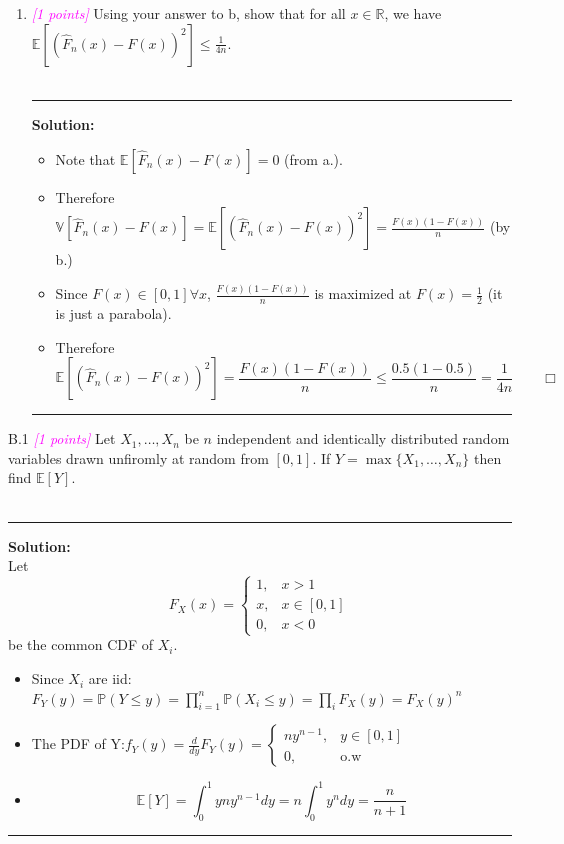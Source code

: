 \documentclass{article}
\newcommand{\field}[1]{\mathbb{#1}}
\newcommand{\1}{\mathbf{1}}
\newcommand{\E}{\mathbb{E}}
\newcommand{\V}{\mathbb{V}}
\renewcommand{\P}{\mathbb{P}}
\newcommand{\R}{\field{R}} %
\newcommand{\points}[1]{\small\textcolor{magenta}{\emph{[#1 points]}} \normalsize}
\begin{document}
\begin{enumerate}
    
    \noindent\rule{\textwidth}{1pt}
  \item \points{1} Using your answer to b, show that
    for all $x\in \R$, we have  $\displaystyle \E[ ( \widehat{F}_n(x) - F(x) )^2 ] \leq \tfrac{1}{4n}$.  
      \\
\\
    \noindent\rule{\textwidth}{1pt}
    {\bf Solution:}\\
    \begin{itemize}
        \item Note that $\E[\widehat{F}_n(x) - F(x)] = 0$ (from a.).
        \item Therefore  $\V[\widehat{F}_n(x) - F(x)] = \E[(\widehat{F}_n(x) - F(x))^2] = \frac{F(x)(1-F(x))}{n}$ (by b.)
        \item Since $F(x) \in [0,1] \forall x$, $\frac{F(x)(1-F(x))}{n}$ is maximized at $F(x) = \frac{1}{2}$ (it is just a parabola).
        \item Therefore $$\boxed{\E[(\widehat{F}_n(x) - F(x))^2] = \frac{F(x)(1-F(x))}{n} \leq \frac{0.5(1-0.5)}{n} = \frac{1}{4n} \qquad \Box}
        $$
    \end{itemize}    
    
    \noindent\rule{\textwidth}{1pt}
  \end{enumerate} 

B.1  \points{1} Let $X_1,\dots,X_n$ be $n$ independent and identically distributed random variables drawn unfiromly at random from $[0,1]$. If $Y = \max\{X_1,\dots,X_n\}$ then find $\E[Y]$.\\
\\
    \noindent\rule{\textwidth}{1pt}
    {\bf Solution:}\\
    Let $$F_X(x) = 
    \begin{cases}
    1, & x>1\\
    x, & x\in[0,1]\\
    0, & x<0
    \end{cases}
    $$ be the common CDF of $X_i$.
    \begin{itemize}
        \item Since $X_i$ are iid: $F_Y(y) = \P(Y \leq y) = \prod_{i=1}^n\P(X_i \le y) = \prod_i F_X(y) = F_X(y)^n$
        \item The PDF of Y:$f_Y(y) = \frac{d}{dy}F_Y(y) = \begin{cases}
    ny^{n-1}, & y\in[0,1]\\
    0, & \text{o.w}
    \end{cases}  $
    \item $$\boxed{\E[Y] = \int_0^1 yny^{n-1}dy = n\int_0^1 y^{n}dy = \frac{n}{n+1} }$$
    \end{itemize}
    \noindent\rule{\textwidth}{1pt}
\end{document}
